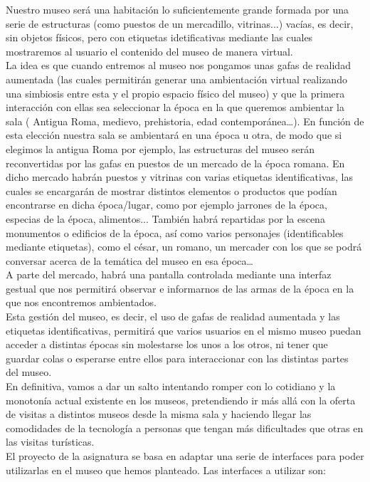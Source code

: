 Nuestro museo será una habitación lo suficientemente grande formada por una serie de estructuras (como puestos de un mercadillo, vitrinas...) vacías, es decir, sin objetos físicos, pero con etiquetas idetificativas mediante las cuales mostraremos al usuario el contenido del museo de manera virtual. \\
La idea es que cuando entremos al museo nos pongamos unas gafas de realidad aumentada (las cuales permitirán generar una ambientación virtual realizando una simbiosis entre esta y el propio espacio físico del museo) y que la primera interacción con ellas sea seleccionar la época en la que queremos ambientar la sala ( Antigua Roma, medievo, prehistoria, edad contemporánea…). En función de esta elección nuestra sala se ambientará en una época u otra, de modo que  si elegimos la antigua Roma por ejemplo, las estructuras del museo serán reconvertidas por las gafas en puestos de un mercado de la época romana. En dicho mercado habrán puestos y vitrinas con varias etiquetas identificativas, las cuales se encargarán de mostrar distintos elementos o productos que podían encontrarse en dicha época/lugar, como por ejemplo jarrones de la época, especias de la época, alimentos... También habrá repartidas por la escena monumentos o edificios de la época, así como varios personajes (identificables mediante etiquetas), como el césar, un romano, un mercader con los que se podrá conversar acerca de la temática del museo en esa época… \\
A parte del mercado, habrá una pantalla controlada mediante una interfaz gestual que nos permitirá observar e informarnos de las armas de la época en la que nos encontremos ambientados.\\
Esta gestión del museo, es decir, el uso de gafas de realidad aumentada y las etiquetas identificativas, permitirá que varios usuarios en el mismo museo puedan acceder a distintas épocas sin molestarse los unos a los otros, ni tener que guardar colas o esperarse entre ellos para interaccionar con las distintas partes del museo.
\\
En definitiva, vamos a dar un salto intentando romper con lo cotidiano y la monotonía actual existente en los museos, pretendiendo ir más allá con la oferta de visitas a distintos museos desde la misma sala y haciendo llegar las comodidades de la tecnología a personas que tengan más dificultades que otras en las visitas turísticas.\\  

El proyecto de la asignatura se basa en adaptar una serie de interfaces para poder utilizarlas en el museo que hemos planteado. Las interfaces a utilizar son:


